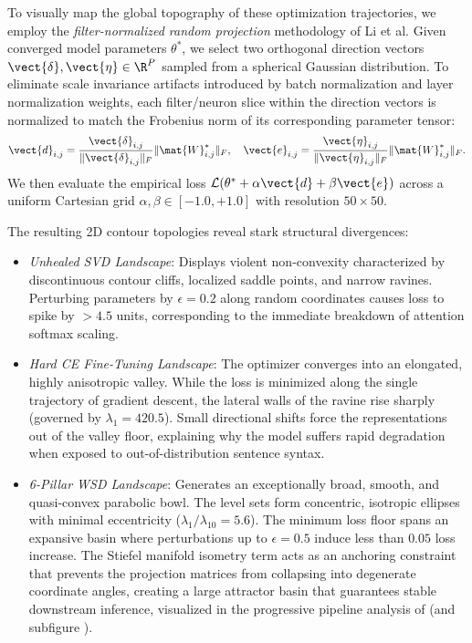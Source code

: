 To visually map the global topography of these optimization trajectories, we employ the \emph{filter-normalized random projection} methodology of Li et al. Given converged model parameters $\theta^*$, we select two orthogonal direction vectors $\vect{\delta}, \vect{\eta} \in \R^P$ sampled from a spherical Gaussian distribution. To eliminate scale invariance artifacts introduced by batch normalization and layer normalization weights, each filter/neuron slice within the direction vectors is normalized to match the Frobenius norm of its corresponding parameter tensor:
\begin{equation}
\vect{d}_{i,j} = \frac{\vect{\delta}_{i,j}}{\|\vect{\delta}_{i,j}\|_F} \|\mat{W}_{i,j}^*\|_F, \quad \vect{e}_{i,j} = \frac{\vect{\eta}_{i,j}}{\|\vect{\eta}_{i,j}\|_F} \|\mat{W}_{i,j}^*\|_F.
\label{eq:filter_normalization}
\end{equation}
We then evaluate the empirical loss $\mathcal{L}(\theta^* + \alpha \vect{d} + \beta \vect{e})$ across a uniform Cartesian grid $\alpha, \beta \in [-1.0, +1.0]$ with resolution $50 \times 50$.

The resulting 2D contour topologies reveal stark structural divergences:
\begin{itemize}
    \item \emph{Unhealed SVD Landscape}: Displays violent non-convexity characterized by discontinuous contour cliffs, localized saddle points, and narrow ravines. Perturbing parameters by $\epsilon = 0.2$ along random coordinates causes loss to spike by $>4.5$ units, corresponding to the immediate breakdown of attention softmax scaling.
    \item \emph{Hard CE Fine-Tuning Landscape}: The optimizer converges into an elongated, highly anisotropic valley. While the loss is minimized along the single trajectory of gradient descent, the lateral walls of the ravine rise sharply (governed by $\lambda_1 = 420.5$). Small directional shifts force the representations out of the valley floor, explaining why the model suffers rapid degradation when exposed to out-of-distribution sentence syntax.
    \item \emph{\neuralops{} 6-Pillar WSD Landscape}: Generates an exceptionally broad, smooth, and quasi-convex parabolic bowl. The level sets form concentric, isotropic ellipses with minimal eccentricity ($\lambda_1 / \lambda_{10} = 5.6$). The minimum loss floor spans an expansive basin where perturbations up to $\epsilon = 0.5$ induce less than $0.05$ loss increase. The Stiefel manifold isometry term acts as an anchoring constraint that prevents the projection matrices from collapsing into degenerate coordinate angles, creating a large attractor basin that guarantees stable downstream inference, visualized in the progressive pipeline analysis of  (and subfigure ).
\end{itemize}

